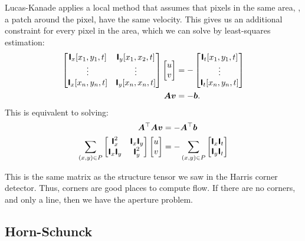 Lucas-Kanade applies a local method that assumes that pixels in the same
area, \ie, a patch around the pixel, have the same velocity. This gives us an
additional constraint for every pixel in the area, which we can solve by
least-squares estimation:
\begin{align*}
  \begin{bmatrix}
    \bm{\mathsf{I}}_x[x_1,y_1,t] & \bm{\mathsf{I}}_y[x_1,x_2,t] \\
    \vdots & \vdots \\
    \bm{\mathsf{I}}_x[x_n,y_n,t] & \bm{\mathsf{I}}_y[x_n,x_n,t]
  \end{bmatrix}
  \begin{bmatrix}
    u \\ v
  \end{bmatrix}
  &=
  -\begin{bmatrix}
    \bm{\mathsf{I}}_t[x_1,y_1,t] \\
    \vdots \\
    \bm{\mathsf{I}}_t[x_n,y_n,t]
  \end{bmatrix} \\
  \bm{A}\bm{v} &= -\bm{b}
.\end{align*}
This is equivalent to solving:
\begin{align*}
  \bm{A}^\top\bm{A}\bm{v} &= -\bm{A}^\top\bm{b} \\
  \sum_{(x,y)\in P}
  \begin{bmatrix}
    \bm{\mathsf{I}}_x^2 & \bm{\mathsf{I}}_x \bm{\mathsf{I}}_y \\
    \bm{\mathsf{I}}_x \bm{\mathsf{I}}_y & \bm{\mathsf{I}}_y^2
  \end{bmatrix}
  \begin{bmatrix}
    u \\ v
  \end{bmatrix}
  &=
  - \sum_{(x,y)\in P}
  \begin{bmatrix}
    \bm{\mathsf{I}}_x \bm{\mathsf{I}}_t \\
    \bm{\mathsf{I}}_y \bm{\mathsf{I}}_t \\
  \end{bmatrix}
\end{align*}

This is the same matrix as the structure tensor we saw in the Harris corner
detector. Thus, corners are good places to compute flow. If there are no
corners, and \eg only a line, then we have the aperture problem.

\subsection{Horn-Schunck}

